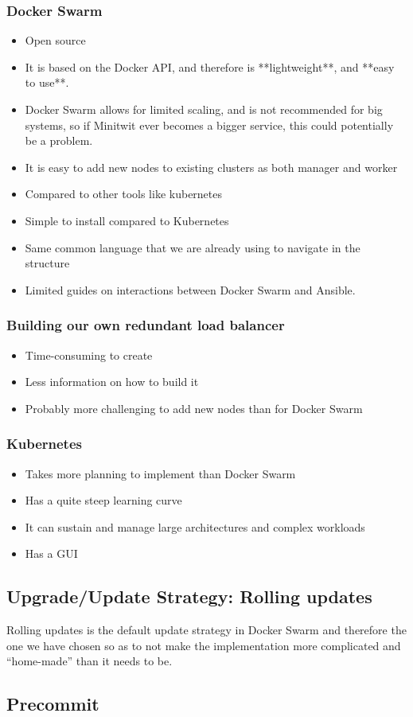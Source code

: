 \subsubsection{Docker Swarm}

\cite{ansible:dockerswarm}
\begin{itemize}
    \item Open source
    \item It is based on the Docker API, and therefore is **lightweight**, and **easy to use**.
    \item Docker Swarm allows for limited scaling, and is not recommended for big systems, so if Minitwit ever becomes a bigger service, this could potentially be a problem.
    \item It is easy to add new nodes to existing clusters as both manager and worker
    \item Compared to other tools like kubernetes
    \item Simple to install compared to Kubernetes
    \item Same common language that we are already using to navigate in the structure
    \item Limited guides on interactions between Docker Swarm and Ansible.
\end{itemize}

\subsubsection{Building our own redundant load balancer}
\begin{itemize}
    \item Time-consuming to create
    \item Less information on how to build it
    \item Probably more challenging to add new nodes than for Docker Swarm
\end{itemize}

\subsubsection{Kubernetes}
\begin{itemize}
    \item Takes more planning to implement than Docker Swarm
    \item Has a quite steep learning curve
    \item It can sustain and manage large architectures and complex workloads
    \item Has a GUI
\end{itemize}

\subsection{Upgrade/Update Strategy: Rolling updates}

Rolling updates is the default update strategy in Docker Swarm and therefore the one we have chosen so as to not make the implementation more complicated and “home-made” than it needs to be.

\subsection{Precommit}
